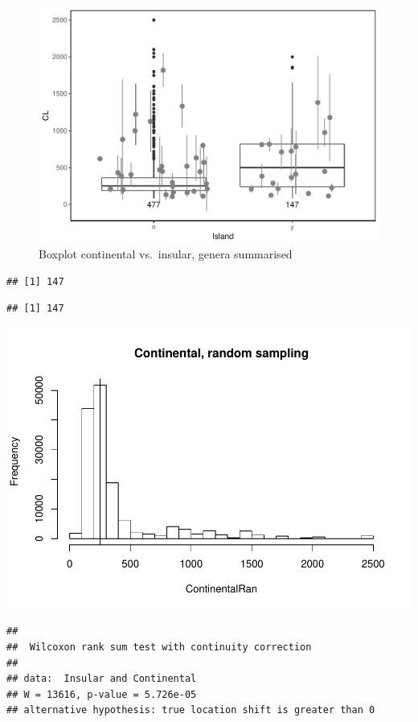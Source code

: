 \documentclass[]{article}
\begin{document}
\begin{figure}[htbp]
\centering
\includegraphics{MA_JJ_files/figure-latex/BPCI-1.pdf}
\caption{Boxplot continental vs.~insular, genera summarised}
\end{figure}

\begin{verbatim}
## [1] 147
\end{verbatim}

\begin{verbatim}
## [1] 147
\end{verbatim}

\includegraphics{MA_JJ_files/figure-latex/RSCI-1.pdf}

\begin{verbatim}
## 
##  Wilcoxon rank sum test with continuity correction
## 
## data:  Insular and Continental
## W = 13616, p-value = 5.726e-05
## alternative hypothesis: true location shift is greater than 0
\end{verbatim}
\end{document}
